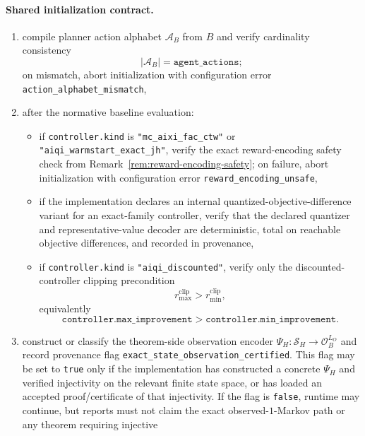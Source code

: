 \documentclass[11pt]{article}
\begin{document}
\paragraph{Shared initialization contract.}
\begin{enumerate}
    \item compile planner action alphabet $\mathcal{A}_B$ from $B$ and verify
    cardinality consistency
    \[
    |\mathcal{A}_B|=\texttt{agent\_actions};
    \]
    on mismatch, abort initialization with configuration error
    \texttt{action\_alphabet\_mismatch},
    \item after the normative baseline evaluation:
    \begin{itemize}
        \item if \texttt{controller.kind} is
        \texttt{"mc\_aixi\_fac\_ctw"} or
        \texttt{"aiqi\_warmstart\_exact\_jh"}, verify the exact
        reward-encoding safety check from
        Remark~\ref{rem:reward-encoding-safety}; on failure, abort
        initialization with configuration error
        \texttt{reward\_encoding\allowbreak\_unsafe},
        \item if the implementation declares an internal
        quantized-objective-difference variant for an exact-family controller,
        verify that the declared
        quantizer and representative-value decoder are deterministic, total on
        reachable objective differences, and recorded in provenance,
        \item if \texttt{controller.kind} is \texttt{"aiqi\_discounted"}, verify
        only the discounted-controller clipping precondition
        \[
        r_{\max}^{\mathrm{clip}}>r_{\min}^{\mathrm{clip}},
        \]
        equivalently
        \[
        \texttt{controller.max\_improvement}
        >
        \texttt{controller.min\_improvement}.
        \]
    \end{itemize}
    \item construct or classify the theorem-side observation encoder
    $\Psi_H:\mathcal{S}_H\to\mathcal{O}_B^{L_O}$ and record provenance flag
    \texttt{exact\allowbreak\_state\allowbreak\_observation\allowbreak\_certified}. This flag may be set to
    \texttt{true} only if the implementation has constructed a concrete
    $\Psi_H$ and verified injectivity on the relevant finite state space, or
    has loaded an accepted proof/certificate of that injectivity. If the flag
    is \texttt{false}, runtime may continue, but reports must not claim the
    exact observed-$1$-Markov path or any theorem requiring injective

\end{enumerate}
\end{document}
